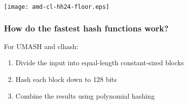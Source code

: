 \documentclass[xcolor=dvipsnames]{beamer}
\begin{document}
\begin{frame}
  \begin{center}
    \texttt{[image: amd-cl-hh24-floor.eps]}
  \end{center}
\end{frame}

















\begin{frame}
  \frametitle{How do the fastest hash functions work?}

  For UMASH and clhash:
  \pause
  $ $\\
  \begin{enumerate}
  \item Divide the input into equal-length constant-sized blocks
    \pause
  \item Hash each block down to 128 bits
    \pause
    \item Combine the results using polynomial hashing
  \end{enumerate}
\end{frame}
\end{document}
